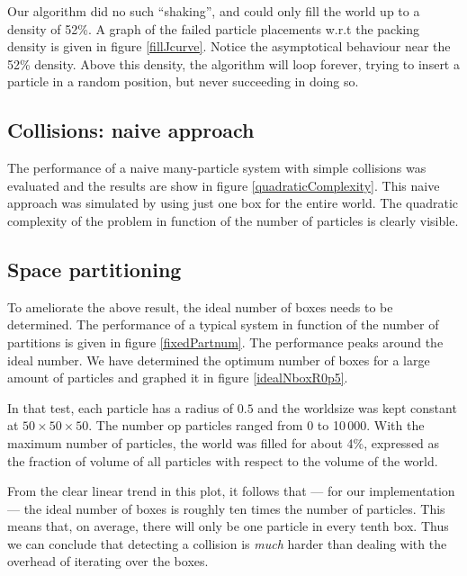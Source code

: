 
Our algorithm did no such ``shaking'', and could only fill the world up to 
a density of 52\%. A graph of the failed particle placements w.r.t the 
packing density is given in figure \ref{fillJcurve}. Notice the 
asymptotical behaviour near the 52\% density. Above this density, the 
algorithm will loop forever, trying to insert a particle in a random position, 
but never succeeding in doing so.

\subsection{Collisions: naive approach}
The performance of a naive many-particle system with simple collisions was 
evaluated and the results are show in figure \ref{quadraticComplexity}.  This 
naive approach was simulated by using just one box for the entire world. The 
quadratic complexity of the problem in function of the number of particles is 
clearly visible.




\subsection{Space partitioning}
To ameliorate the above result, the ideal number of boxes needs to be 
determined.  The performance of a typical system in function of the number of 
partitions is given in figure \ref{fixedPartnum}. The performance peaks around 
the ideal number.  We have determined the optimum number of boxes for a large 
amount of particles and graphed it in figure \ref{idealNboxR0p5}.



In that test, each particle has a radius of $0.5$ and the worldsize was 
kept constant at $50 \times 50 \times 50$. The number op particles ranged 
from 0 to 10\,000. With the maximum number of particles, the world was 
filled for about 4\%, expressed as the fraction of volume of all particles 
with respect to the volume of the world.

From the clear linear trend in this plot, it follows that --- for our 
implementation  --- the ideal number of boxes is roughly ten times the 
number of particles. This means that, on average, there will only be one 
particle in every tenth box. Thus we can conclude that detecting a 
collision is \emph{much} harder than dealing with the overhead of iterating 
over the boxes.


